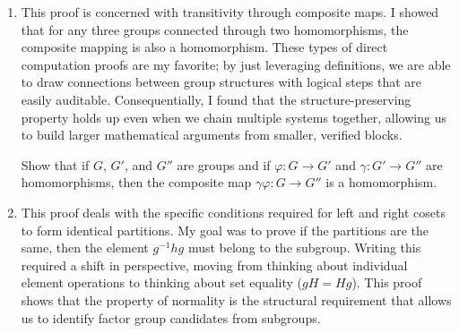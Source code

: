 \begin{enumerate}[label=\textbf{\arabic*.}]
    \begin{problem}
        Let \(\varphi : G \to G'\) be a group homomorphism. Show that if \(|G'|\) is finite, then \(|\varphi[G]|\) is finite and is a divisor of \(|G'|\).
    \end{problem}
    \item This proof is concerned with transitivity through composite maps. I showed that for any three groups connected through two homomorphisms, the composite mapping is also a homomorphism. These types of direct computation proofs are my favorite; by just leveraging definitions, we are able to draw connections between group structures with logical steps that are easily auditable. Consequentially, I found that the structure-preserving property holds up even when we chain multiple systems together, allowing us to build larger mathematical arguments from smaller, verified blocks.

    \begin{problem}
        Show that if \(G\), \(G'\), and \(G''\) are groups and if \(\varphi : G \to G'\) and \(\gamma : G' \to G''\) are homomorphisms, then the composite map \(\gamma \varphi : G \to G''\) is a homomorphism.
    \end{problem}
    \newpage

    \item This proof deals with the specific conditions required for left and right cosets to form identical partitions. My goal was to prove if the partitions are the same, then the element \(g^{-1}hg\) must belong to the subgroup. Writing this required a shift in perspective, moving from thinking about individual element operations to thinking about set equality (\(gH=Hg\)). This proof shows that the property of normality is the structural requirement that allows us to identify factor group candidates from subgroups.


\end{enumerate}
